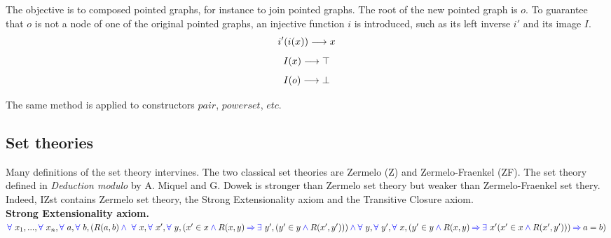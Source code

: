 \documentclass[a4paper]{article}
\begin{document}
\begin{figure}[h]
\end{figure}

The objective is to composed pointed graphs, for instance to join pointed graphs. The root of the new pointed graph is $o$. To guarantee that $o$ is not a node of one of the original pointed graphs, an injective function $i$ is introduced, such as its left inverse $i'$ and its image $I$. 
$$i'(i(x)) \longrightarrow x$$
$$ I(x) \longrightarrow \top $$
$$ I(o) \longrightarrow \bot $$

The same method is applied to constructors $pair$, $powerset$, $etc$.

\subsection{Set theories}

Many definitions of the set theory intervines. The two classical set theories are Zermelo (Z) and Zermelo-Fraenkel (ZF). The set theory defined in \textit{Deduction modulo} by A. Miquel and G. Dowek \cite{zermodulo} is stronger than Zermelo set theory but weaker than Zermelo-Fraenkel set thery. Indeed, IZst contains Zermelo set theory, the Strong Extensionality axiom and the Transitive Closure axiom. \\

\textbf{Strong Extensionality axiom.} ${\color{blue} \forall}~x_1,...,{\color{blue} \forall}~x_n,{\color{blue} \forall}~a,{\color{blue} \forall}~b, \\
(R(a, b) \\
\mathbin{\color{blue} \wedge}~{\color{blue} \forall}~x,{\color{blue} \forall}~x',{\color{blue} \forall}~y,(x' \in x \mathbin{\color{blue} \wedge} R(x, y) \mathbin{\color{blue} \Rightarrow} {\color{blue} \exists}~y', (y' \in y \mathbin{\color{blue} \wedge} R(x', y'))) \\
\mathbin{\color{blue} \wedge} {\color{blue} \forall}~y,{\color{blue} \forall}~y',{\color{blue} \forall}~x, (y' \in y \mathbin{\color{blue} \wedge} R(x, y) \mathbin{\color{blue} \Rightarrow} {\color{blue} \exists}~x'(x' \in x \mathbin{\color{blue} \wedge} R(x', y'))) \\
\mathbin{\color{blue} \Rightarrow} a = b) $
\end{document}

